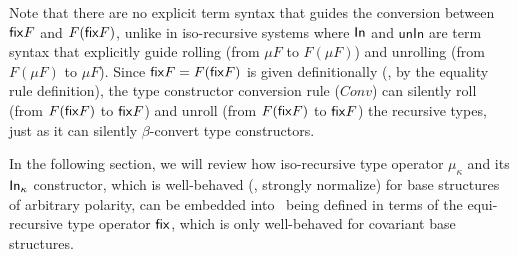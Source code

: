 Note that there are no explicit term syntax that guides the conversion between
$\mathsf{fix} F$ and $F(\mathsf{fix} F)$, unlike in iso-recursive systems where $\mathsf{In}$ and
$\mathsf{unIn}$ are term syntax that explicitly guide rolling
(from $\mu F$ to $F(\mu F)$) and unrolling (from $F(\mu F)$ to $\mu F$).
Since $\mathsf{fix} F=F(\mathsf{fix} F)$ is given definitionally (\ie, by the equality rule
definition), the type constructor conversion rule ($Conv$) can silently
roll (from $F(\mathsf{fix} F)$ to $\mathsf{fix} F$) and unroll (from $F(\mathsf{fix} F)$ to $\mathsf{fix} F$)
the recursive types, just as it can silently $\beta$-convert type constructors.

In the following section, we will review how iso-recursive type operator
$\mu_\kappa$ and its $\mathsf{In}_\kappa$ constructor, which is well-behaved
(\ie, strongly normalize) for base structures of arbitrary polarity,
can be embedded into \Fixi\ being defined in terms of the equi-recursive
type operator $\mathsf{fix}$, which is only well-behaved for covariant base structures.


